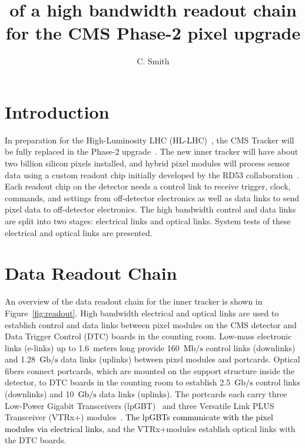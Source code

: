 \documentclass[a4paper,11pt]{article}
\title{\black{Characterization} of a high bandwidth readout chain for the CMS Phase-2 pixel upgrade}
\author{C. Smith}
\affiliation{\black{Department of Physics \& Astronomy, The University of Kansas, 1251 Wescoe Hall Dr., Lawrence, KS 66045, U.S.A.}}
\newcommand{\vtrxp}{VTRx+}
\newcommand{\fig}{Figure}
\newcommand{\mbps}{\ensuremath{\mathrm{Mb}/\mathrm{s}}\xspace}
\newcommand{\gbps}{\ensuremath{\mathrm{Gb}/\mathrm{s}}\xspace}
\newcommand{\black}{\textcolor{black}}
\begin{document}

\maketitle

\flushbottom

\newpage


\section{Introduction}
\label{sec:introduction}

In preparation for the High-Luminosity LHC (HL-LHC)~\cite{ref:hllhc}, the CMS Tracker will be fully replaced in the Phase-2 upgrade~\cite{ref:cms,ref:tdr,ref:orfanelli}.
The new inner tracker will have about two billion silicon pixels installed,
and hybrid pixel modules will process sensor data using a custom readout chip initially developed by the RD53 collaboration~\cite{ref:rd53}.
Each readout chip on the detector needs a control link to receive trigger, clock, commands, and settings from off-detector electronics as well as data links to send pixel data to off-detector electronics.
The high bandwidth control and data links are split into two stages: electrical links and optical links.
System tests of these electrical and optical links are presented.

\section{Data Readout Chain}
\label{sec:readout}

An overview of the data readout chain for the inner tracker is shown in \fig~\ref{fig:readout}.
High bandwidth electrical and optical links are used to establish control and data links between pixel modules on the CMS detector and Data Trigger Control (DTC) boards in the counting room.
Low-mass electronic links (e-links) up to 1.6~meters long provide 160~\black{\mbps} control links (downlinks) and 1.28~\black{\gbps} data links (uplinks) between pixel modules and portcards.
Optical fibers connect portcards, which are mounted on the support structure inside the detector, to DTC boards in the counting room to establish 2.5~\black{\gbps} control links (downlinks) and 10~\black{\gbps} data links (uplinks).
The portcards each carry three Low-Power Gigabit Transceivers (lpGBT)~\cite{ref:lpgbt_1} and three Versatile Link PLUS Transceiver (\vtrxp) modules~\cite{ref:vtrxp}.
\black{The lpGBTs communicate with the pixel modules via electrical links}, and the \vtrxp\space modules establish optical links with the DTC boards.
\end{document}
